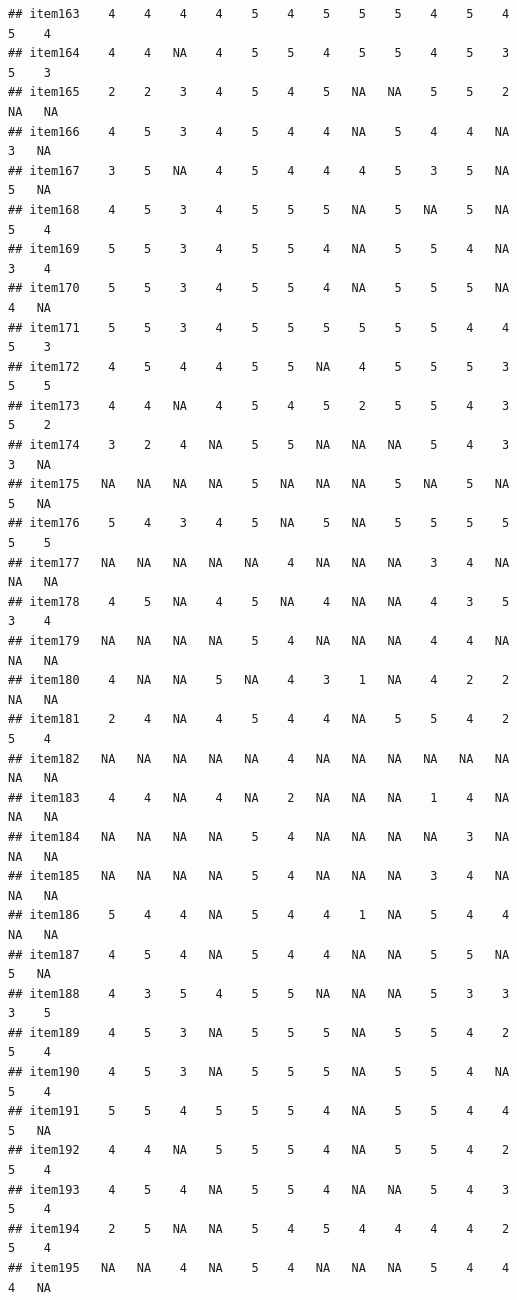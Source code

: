 \documentclass[
  man]{apa6}
\begin{document}
\begin{verbatim}
## item163    4    4    4    4    5    4    5    5    5    4    5    4    5    4
## item164    4    4   NA    4    5    5    4    5    5    4    5    3    5    3
## item165    2    2    3    4    5    4    5   NA   NA    5    5    2   NA   NA
## item166    4    5    3    4    5    4    4   NA    5    4    4   NA    3   NA
## item167    3    5   NA    4    5    4    4    4    5    3    5   NA    5   NA
## item168    4    5    3    4    5    5    5   NA    5   NA    5   NA    5    4
## item169    5    5    3    4    5    5    4   NA    5    5    4   NA    3    4
## item170    5    5    3    4    5    5    4   NA    5    5    5   NA    4   NA
## item171    5    5    3    4    5    5    5    5    5    5    4    4    5    3
## item172    4    5    4    4    5    5   NA    4    5    5    5    3    5    5
## item173    4    4   NA    4    5    4    5    2    5    5    4    3    5    2
## item174    3    2    4   NA    5    5   NA   NA   NA    5    4    3    3   NA
## item175   NA   NA   NA   NA    5   NA   NA   NA    5   NA    5   NA    5   NA
## item176    5    4    3    4    5   NA    5   NA    5    5    5    5    5    5
## item177   NA   NA   NA   NA   NA    4   NA   NA   NA    3    4   NA   NA   NA
## item178    4    5   NA    4    5   NA    4   NA   NA    4    3    5    3    4
## item179   NA   NA   NA   NA    5    4   NA   NA   NA    4    4   NA   NA   NA
## item180    4   NA   NA    5   NA    4    3    1   NA    4    2    2   NA   NA
## item181    2    4   NA    4    5    4    4   NA    5    5    4    2    5    4
## item182   NA   NA   NA   NA   NA    4   NA   NA   NA   NA   NA   NA   NA   NA
## item183    4    4   NA    4   NA    2   NA   NA   NA    1    4   NA   NA   NA
## item184   NA   NA   NA   NA    5    4   NA   NA   NA   NA    3   NA   NA   NA
## item185   NA   NA   NA   NA    5    4   NA   NA   NA    3    4   NA   NA   NA
## item186    5    4    4   NA    5    4    4    1   NA    5    4    4   NA   NA
## item187    4    5    4   NA    5    4    4   NA   NA    5    5   NA    5   NA
## item188    4    3    5    4    5    5   NA   NA   NA    5    3    3    3    5
## item189    4    5    3   NA    5    5    5   NA    5    5    4    2    5    4
## item190    4    5    3   NA    5    5    5   NA    5    5    4   NA    5    4
## item191    5    5    4    5    5    5    4   NA    5    5    4    4    5   NA
## item192    4    4   NA    5    5    5    4   NA    5    5    4    2    5    4
## item193    4    5    4   NA    5    5    4   NA   NA    5    4    3    5    4
## item194    2    5   NA   NA    5    4    5    4    4    4    4    2    5    4
## item195   NA   NA    4   NA    5    4   NA   NA   NA    5    4    4    4   NA

\end{verbatim}
\end{document}

